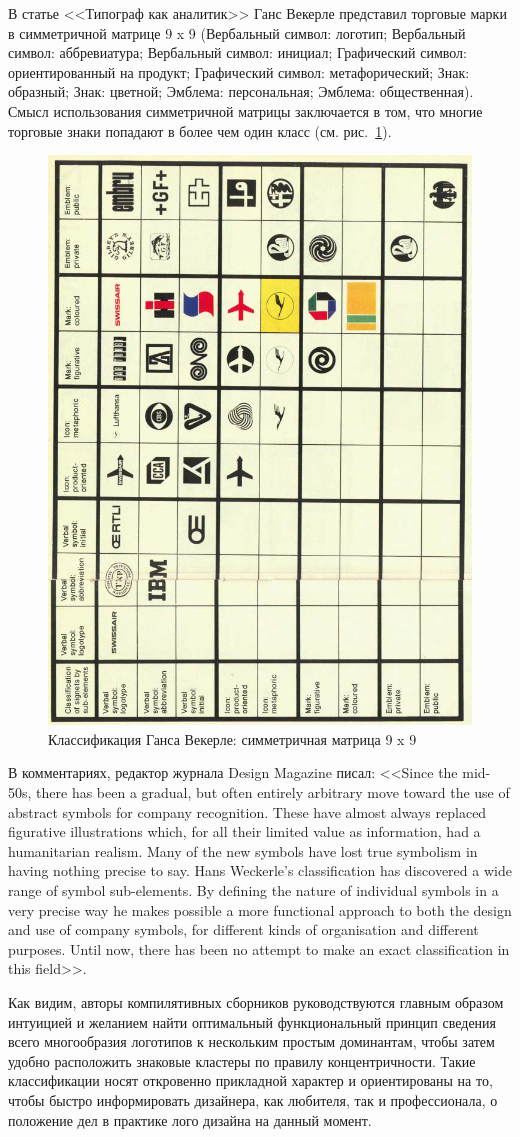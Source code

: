 В статье <<Типограф как аналитик>> Ганс Векерле\autocite{weckerle1968typographer} представил торговые марки в
симметричной матрице 9 x 9 (Вербальный символ: логотип; Вербальный символ: аббревиатура; Вербальный
символ: инициал; Графический символ: ориентированный на продукт; Графический символ: метафорический;
Знак: образный; Знак: цветной; Эмблема: персональная; Эмблема: общественная). Смысл использования
симметричной матрицы заключается в том, что многие торговые знаки попадают в более чем один
класс (см. рис.~\ref{fig:wekerle}).

\begin{figure}
  \centering
  \includegraphics[width=.5\linewidth]{images/wekerle}
  \caption{Классификация Ганса Векерле: симметричная матрица 9 x 9}
  \label{fig:wekerle}
\end{figure}

В комментариях, редактор журнала Design Magazine писал: <<Since the mid-50s, there has
been a gradual, but often entirely arbitrary move toward the use of abstract symbols for company
recognition. These have almost always replaced figurative illustrations which, for all their limited
value as information, had a humanitarian realism. Many of the new symbols have lost true symbolism
in having nothing precise to say. Hans Weckerle’s classification has discovered a wide range of
symbol sub-elements. By defining the nature of individual symbols in a very precise way he makes
possible a more functional approach to both the design and use of company symbols, for different
kinds of organisation and different purposes. Until now, there has been no attempt to make an exact
classification in this field>>.

Как видим, авторы компилятивных сборников руководствуются главным образом интуицией и желанием найти
оптимальный функциональный принцип сведения всего многообразия логотипов к нескольким простым
доминантам, чтобы затем удобно расположить знаковые кластеры по правилу концентричности. Такие
классификации носят откровенно прикладной характер и ориентированы на то, чтобы быстро информировать
дизайнера, как любителя, так и профессионала, о положение дел в практике лого дизайна на данный
момент.

